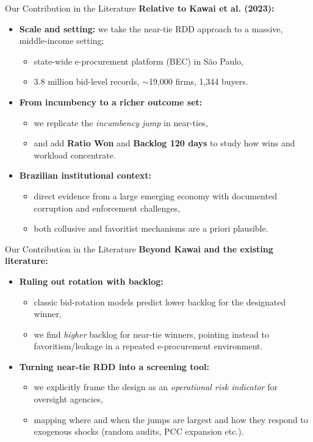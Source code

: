 \documentclass{beamer}
\begin{document}
\begin{frame}{Our Contribution in the Literature}
\textbf{Relative to Kawai et al. (2023):}
\begin{itemize}
  \item \textbf{Scale and setting:} we take the near-tie RDD approach to a massive, middle-income setting:
  \begin{itemize}
    \item state-wide e-procurement platform (BEC) in S\~ao Paulo,
    \item 3.8 million bid-level records, $\sim$19,000 firms, 1,344 buyers.
  \end{itemize}
  \item \textbf{From incumbency to a richer outcome set:}
  \begin{itemize}
    \item we replicate the \emph{incumbency jump} in near-ties,
    \item and add \textbf{Ratio Won} and \textbf{Backlog 120 days} to study how wins and workload concentrate.
  \end{itemize}
  \item \textbf{Brazilian institutional context:}
  \begin{itemize}
    \item direct evidence from a large emerging economy with documented corruption and enforcement challenges,
    \item both collusive and favoritist mechanisms are a priori plausible.
  \end{itemize}
\end{itemize}
\end{frame}


\begin{frame}{Our Contribution in the Literature}
\textbf{Beyond Kawai and the existing literature:}
\begin{itemize}
   \item \textbf{Ruling out rotation with backlog:}
  \begin{itemize}
    \item classic bid-rotation models predict lower backlog for the designated winner,
    \item we find \emph{higher} backlog for near-tie winners, pointing instead to favoritism/leakage in a repeated e-procurement environment.
  \end{itemize}
  \item \textbf{Turning near-tie RDD into a screening tool:}
  \begin{itemize}
    \item we explicitly frame the design as an \emph{operational risk indicator} for oversight agencies,
    \item mapping where and when the jumps are largest and how they respond to\\ exogenous shocks (random audits, PCC expansion etc.).
  \end{itemize}
\end{itemize}
\end{frame}
\end{document}
